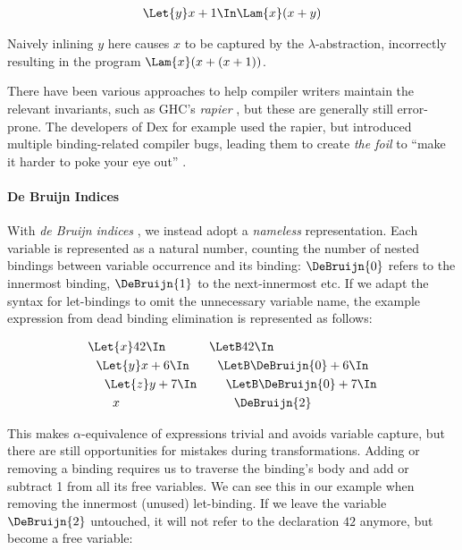     \begin{align*}
      \Let{y} x + 1 \In \Lam{x} (x + y)
    \end{align*}

    Naively inlining $y$ here causes $x$ to be captured
    by the $\lambda$-abstraction, incorrectly resulting in the program
    $\Lam{x} (x + (x + 1))$.

    There have been various approaches to help compiler writers
    maintain the relevant invariants,
    such as GHC's \emph{rapier} \cite{Jones2002GHCInliner},
    but these are generally still error-prone.
    The developers of Dex for example used the rapier,
    but introduced multiple binding-related compiler bugs,
    leading them to create \emph{the foil}
    to ``make it harder to poke your eye out''
    \cite{Maclaurin2022Foil}.

  \paragraph{De Bruijn Indices}
    With \emph{de Bruijn indices}
    \cite{DeBruijn1972NamelessIndices},
    we instead adopt a \emph{nameless} representation.
    Each variable is represented as a natural number,
    counting the number of nested bindings between variable occurrence and its binding:
    $\DeBruijn{0}$ refers to the innermost binding, $\DeBruijn{1}$ to the next-innermost etc.
    If we adapt the syntax for let-bindings to omit the unnecessary variable name,
    the example expression from dead binding elimination is represented as follows:

    \begin{align*}
      &\Let{x} 42 \In            & &\LetB 42 \In                       \\
      &\ \ \Let{y} x + 6 \In     & &\ \ \LetB \DeBruijn{0} + 6 \In     \\
      &\ \ \ \ \Let{z} y + 7 \In & &\ \ \ \ \LetB \DeBruijn{0} + 7 \In \\
      &\ \ \ \ \ \ x             & &\ \ \ \ \ \ \DeBruijn{2}
    \end{align*}

    This makes $\alpha$-equivalence of expressions trivial and avoids variable capture,
    but there are still opportunities for mistakes during transformations.
    Adding or removing a binding
    requires us to traverse the binding's body and add or subtract 1 from all its free variables.
    We can see this in our example when removing the innermost (unused) let-binding.
    If we leave the variable $\DeBruijn{2}$ untouched,
    it will not refer to the declaration $42$ anymore,
    but become a free variable:

